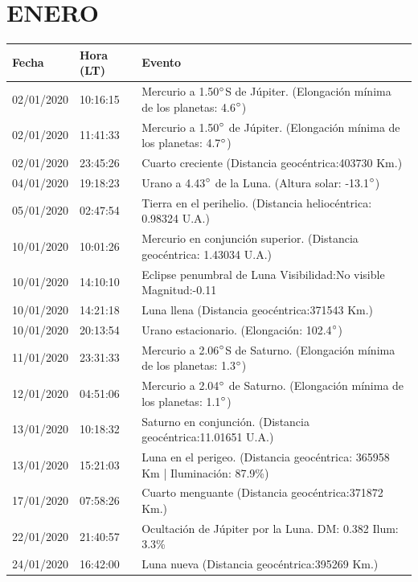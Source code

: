 \documentclass[12pt,a4paper,oneside]{article}
\begin{document}
\section{ENERO}
\begin{center}
\begin{tabular}{ |l| l| l| }
\hline
 \textbf{Fecha} & \textbf{Hora (LT)} & \textbf{Evento}\\
 \hline
02/01/2020 & 10:16:15   &  Mercurio a 1.50$\degree$S de Júpiter. (Elongación mínima de los planetas: 4.6$\degree$)	  \\
02/01/2020 &  11:41:33   &  Mercurio a 1.50$\degree$ de Júpiter. (Elongación mínima de los planetas: 4.7$\degree$)	  \\
02/01/2020 &  23:45:26   &  Cuarto creciente (Distancia geocéntrica:403730 Km.)	  \\
04/01/2020 &  19:18:23   &  Urano a 4.43$\degree$ de la Luna. (Altura solar: -13.1$\degree$)	  \\
05/01/2020 &  02:47:54   &  Tierra en el perihelio. (Distancia heliocéntrica: 0.98324 U.A.)	  \\
10/01/2020 &  10:01:26   &  Mercurio en conjunción superior. (Distancia geocéntrica: 1.43034 U.A.)	  \\
10/01/2020 &  14:10:10   &  Eclipse penumbral de Luna Visibilidad:No visible Magnitud:-0.11	  \\
10/01/2020 &  14:21:18   &  Luna llena (Distancia geocéntrica:371543 Km.)	  \\
10/01/2020 &  20:13:54   &  Urano estacionario. (Elongación: 102.4$\degree$)	  \\
11/01/2020 &  23:31:33   &  Mercurio a 2.06$\degree$S de Saturno. (Elongación mínima de los planetas: 1.3$\degree$)	  \\
12/01/2020 &  04:51:06   &  Mercurio a 2.04$\degree$ de Saturno. (Elongación mínima de los planetas: 1.1$\degree$)	  \\
13/01/2020 &  10:18:32   &  Saturno en conjunción. (Distancia geocéntrica:11.01651 U.A.)	  \\
13/01/2020 &  15:21:03   &  Luna en el perigeo. (Distancia geocéntrica: 365958 Km | Iluminación: 87.9\%)	  \\
17/01/2020 &  07:58:26   &  Cuarto menguante (Distancia geocéntrica:371872 Km.)	  \\
22/01/2020 &  21:40:57   &  Ocultación de Júpiter por la Luna. DM: 0.382 Ilum: 3.3\%  \\
24/01/2020 &  16:42:00   &  Luna nueva (Distancia geocéntrica:395269 Km.)	  \\

\end{tabular}
\end{center}
\end{document}
